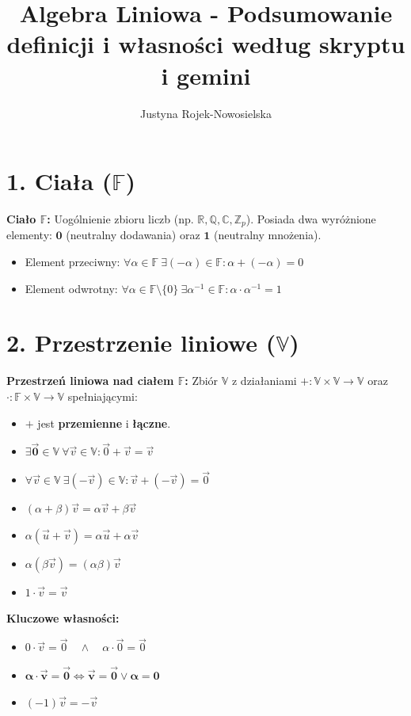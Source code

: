 \documentclass[12pt,a4paper]{article}
\title{\textbf{Algebra Liniowa - Podsumowanie definicji i własności według skryptu i gemini}}
\author{Justyna Rojek-Nowosielska}
\begin{document}
\maketitle

\section*{1. Ciała ($\mathbb{F}$)}
\noindent\textbf{Ciało $\mathbb{F}$:} Uogólnienie zbioru liczb (np. $\mathbb{R}, \mathbb{Q}, \mathbb{C}, \mathbb{Z}_p$). Posiada dwa wyróżnione elementy: $\mathbf{0}$ (neutralny dodawania) oraz $\mathbf{1}$ (neutralny mnożenia).
\begin{itemize}
    \item Element przeciwny: $\forall \alpha \in \mathbb{F}\ \exists (-\alpha) \in \mathbb{F}: \alpha + (-\alpha) = 0$
    \item Element odwrotny: $\forall \alpha \in \mathbb{F} \setminus \{0\}\ \exists \alpha^{-1} \in \mathbb{F}: \alpha \cdot \alpha^{-1} = 1$
\end{itemize}

\section*{2. Przestrzenie liniowe ($\mathbb{V}$)}
\noindent\textbf{Przestrzeń liniowa nad ciałem $\mathbb{F}$:} Zbiór $\mathbb{V}$ z działaniami $+: \mathbb{V} \times \mathbb{V} \to \mathbb{V}$ oraz $\cdot: \mathbb{F} \times \mathbb{V} \to \mathbb{V}$ spełniającymi:
\begin{itemize}
    \item $+$ jest \textbf{przemienne} i \textbf{łączne}.
    \item $\exists \mathbf{\vec{0}} \in \mathbb{V}\ \forall \vec{v} \in \mathbb{V}: \vec{0} + \vec{v} = \vec{v}$
    \item $\forall \vec{v} \in \mathbb{V}\ \exists (-\vec{v}) \in \mathbb{V}: \vec{v} + (-\vec{v}) = \vec{0}$
    \item $(\alpha + \beta)\vec{v} = \alpha\vec{v} + \beta\vec{v}$
    \item $\alpha(\vec{u} + \vec{v}) = \alpha\vec{u} + \alpha\vec{v}$
    \item $\alpha(\beta\vec{v}) = (\alpha\beta)\vec{v}$
    \item $1 \cdot \vec{v} = \vec{v}$
\end{itemize}

\noindent\textbf{Kluczowe własności:}
\begin{itemize}
    \item $0 \cdot \vec{v} = \vec{0} \quad \land \quad \alpha \cdot \vec{0} = \vec{0}$
    \item $\mathbf{\alpha \cdot \vec{v} = \vec{0} \iff \vec{v} = \vec{0} \lor \alpha = 0}$
    \item $(-1)\vec{v} = -\vec{v}$
\end{itemize}
\end{document}
